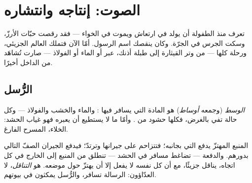 \chapter{الصوت: إنتاجه وانتشاره}\label{ch:g7:sound-production}

تعرف منذ الطفولة أن  يولد في ارتعاش ويموت في الخواء ---
فقد رقصت حبّات الأرزّ، وسكت الجرس في الجرّة. وكان ينقصك اسم
الرسول. أمّا الآن فتملك العالم الجزيئي، ورحلة  كلها ---
من وتر القيثارة إلى طبلة أذنك، عبر  أو الماء أو الفولاذ
--- صارت تُشاهَد من الداخل أخيرًا.

\section{الرُّسل}

\begin{definition}[الوسط]\label{def:g7:sound-production:medium}
\emph{الوسط} (وجمعه \emph{أوساط}) هو المادة التي
يسافر فيها :  والماء والخشب والفولاذ --- وكل حالة
تفي بالغرض، فكلها حشود من . وأمّا ما لا يستطيع  أن
يعبره فهو غياب الحشد: الخلاء، المسرح الفارغ.
\end{definition}

\begin{proposition}\label{prop:g7:sound-production:travel}
المنبع المهتزّ يدفع  التي بجانبه؛ فتتزاحم على جيرانها
وترتدّ؛ فيدفع الجيران الصفّ التالي بدورهم. والدفعة --- تضاغط
مسافر في الحشد --- تنطلق من المنبع إلى الخارج في كل اتجاه،
 يناقل جزيئًا، مع أن كل  نفسه لا يفعل إلا أن يهتزّ حول
موضعه.  هو \emph{التناقل}، لا العدّاؤون: الرسالة تسافر،
والرُّسل يمكثون في بيوتهم.
\end{proposition}

